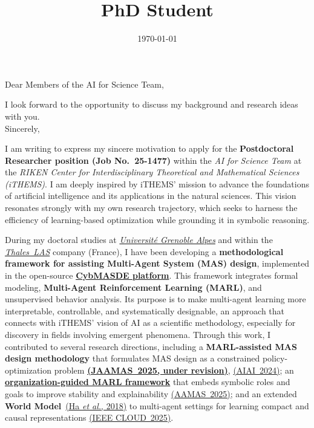 \documentclass[11pt,a4paper,sans]{moderncv}
\title{PhD Student}
\begin{document}
\date{\today}
\opening{Dear Members of the AI for Science Team,}
\closing{{I look forward to the opportunity to discuss my background and research ideas with you.}\\[0.6cm]Sincerely,\vspace{-1cm}}

\makelettertitle
\justifying

\vspace{-0.1cm}
\noindent
I am writing to express my sincere motivation to apply for the \textbf{Postdoctoral Researcher position (Job No.~25-1477)} within the \textit{AI for Science Team} at the \textit{RIKEN Center for Interdisciplinary Theoretical and Mathematical Sciences (iTHEMS)}. I am deeply inspired by iTHEMS' mission to advance the foundations of artificial intelligence and its applications in the natural sciences. This vision resonates strongly with my own research trajectory, which seeks to harness the efficiency of learning-based optimization while grounding it in symbolic reasoning.

During my doctoral studies at \href{https://www.univ-grenoble-alpes.fr/english/}{\textit{Université Grenoble Alpes}} and within the \href{https://www.thalesgroup.com/}{\textit{Thales~LAS}} company (France), I have been developing a \textbf{methodological framework for assisting Multi-Agent System (MAS) design}, implemented in the open-source \href{https://github.com/julien6/CybMASDE}{\textbf{CybMASDE platform}}. This framework integrates formal modeling, \textbf{Multi-Agent Reinforcement Learning (MARL)}, and unsupervised behavior analysis. Its purpose is to make multi-agent learning more interpretable, controllable, and systematically designable, an approach that connects with iTHEMS' vision of AI as a scientific methodology, especially for discovery in fields involving emergent phenomena.
%
Through this work, I contributed to several research directions, including a \textbf{MARL-assisted MAS design methodology} that formulates MAS design as a constrained policy-optimization problem \href{https://sciety-labs.elifesciences.org/articles/by?article_doi=10.21203/rs.3.rs-7166037/v1}{\textbf{(JAAMAS~2025, under revision)}}, \href{https://link.springer.com/chapter/10.1007/978-3-031-63223-5_24}{(AIAI~2024)}; an \href{https://github.com/julien6/MOISE-MARL}{\textbf{organization-guided MARL framework}} that embeds symbolic roles and goals to improve stability and explainability \href{https://arxiv.org/abs/2503.23615}{(AAMAS~2025)}; and an extended \textbf{World Model}~\href{https://link.springer.com/chapter/10.1007/978-3-031-63223-5_24}{(Ha \textit{et al.}, 2018)} to multi-agent settings for learning compact and causal representations \href{https://arxiv.org/abs/2505.21559}{(IEEE CLOUD~2025)}.
\end{document}
